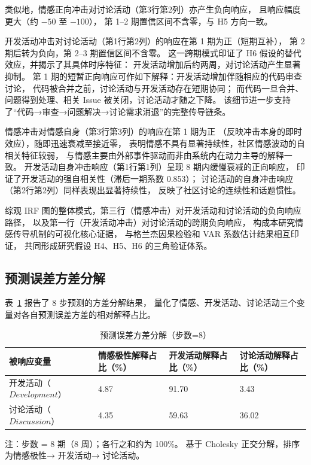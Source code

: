 类似地，情感正向冲击对讨论活动（第3行第2列）亦产生负向响应，
且响应幅度更大（约 $-50$ 至 $-100$），
第 1--2 期置信区间不含零，与 H5 方向一致。

开发活动冲击对讨论活动（第1行第2列）的响应在第 1 期为正（短期互补），
第 2 期后转为负向，第 2--3 期置信区间不含零。
这一跨期模式印证了 H6 假设的替代效应，并揭示了其具体时序特征：
开发活动增加后约两周，对讨论活动产生显著抑制。
第 1 期的短暂正向响应可作如下解释：开发活动增加伴随相应的代码审查讨论，
代码被合并之前，讨论活动与开发活动存在短期协同；
而代码一旦合并、问题得到处理、相关 Issue 被关闭，讨论活动才随之下降。
该细节进一步支持了“代码→审查→问题解决→讨论需求消退”的完整传导链条。

情感冲击对情感自身（第3行第3列）的响应在第 1 期为正
（反映冲击本身的即时效应），随即迅速衰减至接近零，
表明情感不具有显著持续性，社区情感波动的自相关特征较弱，
与情感主要由外部事件驱动而非由系统内在动力主导的解释一致。
开发活动自身冲击响应（第1行第1列）呈现 8 期内缓慢衰减的正向响应，
印证了开发活动的强自相关性（滞后一期系数 0.853）；
讨论活动的自身冲击响应（第2行第2列）同样表现出显著持续性，
反映了社区讨论的连续性和话题惯性。

综观 IRF 图的整体模式，第三行（情感冲击）对开发活动和讨论活动的负向响应路径，
以及第一行（开发活动冲击）对讨论活动的跨期负向响应，
构成本研究情感传导机制的可视化核心证据，
与格兰杰因果检验和 VAR 系数估计结果相互印证，
共同形成研究假设 H4、H5、H6 的三角验证体系。

\subsection{预测误差方差分解}

表~\ref{tab:fevd} 报告了 8 步预测的方差分解结果，
量化了情感、开发活动、讨论活动三个变量对各自预测误差方差的相对解释占比。

\begin{table}[htbp]
    \centering
    \caption{预测误差方差分解（步数=8）}
    \label{tab:fevd}
    \begin{tabularx}{\textwidth}{p{3.5cm}XXX}
        \toprule
        被响应变量 & 情感极性解释占比（\%） & 开发活动解释占比（\%） & 讨论活动解释占比（\%） \\
        \midrule
        开发活动（$Development$）    & 4.87 & 91.70 & 3.43 \\
        讨论活动（$Discussion$） & 4.35 & 59.63 & 36.02 \\
        \bottomrule
    \end{tabularx}
    \begin{minipage}{\textwidth}
        \vspace{0.3em}
        \footnotesize 注：步数 = 8 期（8 周）；各行之和约为 100\%。
              基于 Cholesky 正交分解，排序为情感极性→ 开发活动→ 讨论活动。
    \end{minipage}
\end{table}

